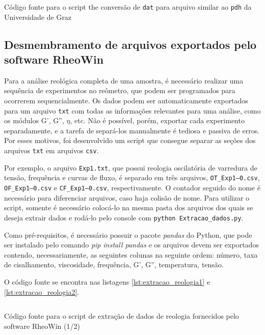 \begin{apendicesenv}
\begin{listing}[H]
	\inputminted{python}{./python/LNLS_dat_to_pdh.py}
	\caption{Código fonte para o script the conversão de \texttt{dat} para arquivo similar ao \texttt{pdh} da Universidade de Graz}  %
	\label{lst:LNLS_pdh}
\end{listing}

\end{apendicesenv}

\subsection{Desmembramento de arquivos exportados pelo software RheoWin}

Para a análise reológica completa de uma amostra, é necessário realizar uma sequência de experimentos no reômetro, que podem ser programados para ocorrerem sequencialmente. Os dados podem ser automaticamente exportados para um arquivo \texttt{txt} com todas as informações relevantes para uma análise, como os módulos G', G'', \(\eta\), etc. Não é possível, porém, exportar cada experimento separadamente, e a tarefa de separá-los manualmente é tediosa e passiva de erros. Por esses motivos, foi desenvolvido um script que consegue separar as seções dos arquivos \texttt{txt} em arquivos \texttt{csv}.

Por exemplo, o arquivo \texttt{Exp1.txt}, que possui reologia oscilatória de varredura de tensão, frequência e curvas de fluxo, é separado em três arquivos, \texttt{OT\_Exp1--0.csv}, \texttt{OF\_Exp1--0.csv} e \texttt{CF\_Exp1--0.csv}, respectivamente. O contador seguido do nome é necessário para diferenciar arquivos, caso haja colisão de nome. Para utilizar o script, somente é necessário colocá-lo na mesma pasta dos arquivos dos quais se deseja extrair dados e rodá-lo pelo console com \texttt{python Extracao\_dados.py}.

Como pré-requisitos, é necessário possuir o pacote \emph{pandas} do Python, que pode ser instalado pelo comando \emph{pip install pandas} e os arquivos devem ser exportados contendo, necessariamente, as seguintes colunas na seguinte ordem: número, taxa de cisalhamento, viscosidade, frequência, G', G'', temperatura, tensão.

O código fonte se encontra nas listagens \ref{lst:extracao_reologia1} e \ref{lst:extracao_reologia2}.

\begin{listing}[H]
	\inputminted{python}{./python/extracao_reologia1.py}
	\caption{Código fonte para o script de extração de dados de reologia fornecidos pelo software RheoWin (1/2)}  
	\label{lst:extracao_reologia1}
\end{listing}

